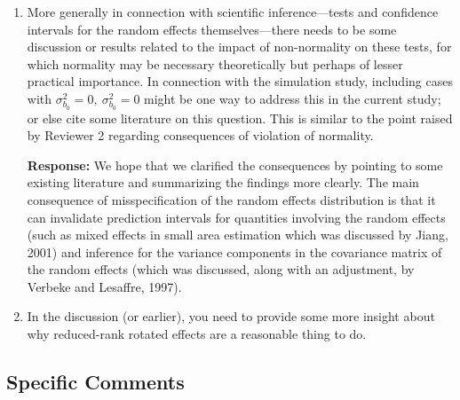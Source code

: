 \documentclass[11pt]{article}
\begin{document}
\begin{enumerate}
\item More generally in connection with scientific inference---tests and confidence intervals for the random effects themselves---there needs to be some discussion or results related to the impact of non-normality on these tests, for which normality may be necessary theoretically but perhaps of lesser practical importance. In connection with the simulation study, including cases with $\sigma^2_{b_0} = 0, \ \sigma^2_{b_0} = 0$ might be one way to address this in the current study; or else cite some literature on this question. This is similar to the point raised by Reviewer 2 regarding consequences of violation of normality.

\textbf{Response:} We hope that we clarified the consequences by pointing to some existing literature and summarizing the findings more clearly. The main consequence of misspecification of the random effects distribution is that it can invalidate prediction intervals for quantities involving the random effects (such as mixed effects in small area estimation which was discussed by Jiang, 2001) and inference for the variance components in the covariance matrix of the random effects (which was discussed, along with an adjustment, by Verbeke and Lesaffre, 1997).


\item In the discussion (or earlier), you need to provide some more insight about why reduced-rank rotated effects are a reasonable thing to do.

\end{enumerate}

\subsection*{Specific Comments}
\end{document}
